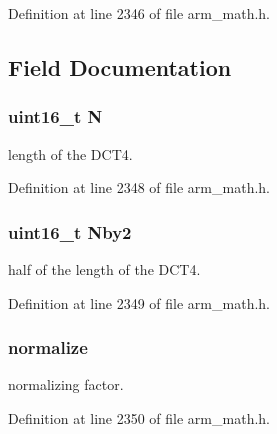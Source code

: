 Definition at line 2346 of file arm\+\_\+math.\+h.



\subsection{Field Documentation}
\subsubsection[{\texorpdfstring{N}{N}}]{\setlength{\rightskip}{0pt plus 5cm}uint16\+\_\+t N}\hypertarget{structarm__dct4__instance__q15_a37d49571fe35012087153c093705cd11}{}\label{structarm__dct4__instance__q15_a37d49571fe35012087153c093705cd11}
length of the D\+C\+T4. 

Definition at line 2348 of file arm\+\_\+math.\+h.

\subsubsection[{\texorpdfstring{Nby2}{Nby2}}]{\setlength{\rightskip}{0pt plus 5cm}uint16\+\_\+t Nby2}\hypertarget{structarm__dct4__instance__q15_afa64b1618089e35c2b55cff71cb29715}{}\label{structarm__dct4__instance__q15_afa64b1618089e35c2b55cff71cb29715}
half of the length of the D\+C\+T4. 

Definition at line 2349 of file arm\+\_\+math.\+h.

\subsubsection[{\texorpdfstring{normalize}{normalize}}]{ normalize}\hypertarget{structarm__dct4__instance__q15_a8ba8c9fa75542dac82553fee982ccd3e}{}\label{structarm__dct4__instance__q15_a8ba8c9fa75542dac82553fee982ccd3e}
normalizing factor. 

Definition at line 2350 of file arm\+\_\+math.\+h.

